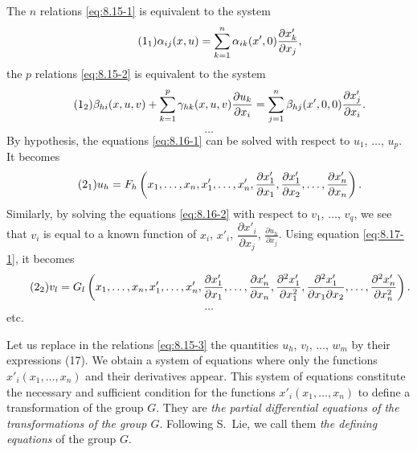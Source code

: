 \documentclass[leqno,11pt]{book}
\numberwithin{equation}{chapter}
\newcommand{\pd}{\partial}
\theoremstyle{shape1}
\theoremstyle{shapesmall}
\newcommand{\somespace}{\vspace{9pt}}
\begin{document}
The $n$ relations \eqref{eq:8.15-1} is equivalent to the system
\begin{equation}\addtocounter{equation}{1}
  \label{eq:8.16-1}\tag{\arabic{equation}$_{1}$}
  \alpha_{ij}(x,u)=\sum_{k=1}^{n}\alpha_{ik}(x',0)\frac{\pd x'_{k}}{\pd x_{j}},
\end{equation}
the $p$ relations \eqref{eq:8.15-2} is equivalent to the system
\begin{equation}
  \label{eq:8.16-2}\tag{\arabic{equation}$_{2}$}
  \beta_{hi}(x,u,v)+\sum_{k=1}^{p}\gamma_{hk}(x,u,v)\frac{\pd u_{k}}{\pd x_{i}}=\sum_{j=1}^{n}\beta_{hj}(x',0,0)\frac{\pd x'_{j}}{\pd x_{i}}.
\end{equation}
\[\hdots\]
By hypothesis, the equations \eqref{eq:8.16-1} can be solved with respect to $u_{1}$, $\dots$, $u_{p}$. It becomes
\begin{equation}\addtocounter{equation}{1}
  \label{eq:8.17-1}\tag{\arabic{equation}$_{1}$}
  u_{h}=F_{h}\left(x_{1},\dots,x_{n},x'_{1},\dots,x'_{n},\frac{\pd x'_{1}}{\pd x_{1}},\frac{\pd x'_{1}}{\pd x_{2}},\dots,\frac{\pd x'_{n}}{\pd x_{n}}\right).
\end{equation}
Similarly, by solving the equations \eqref{eq:8.16-2} with respect to $v_{1}$, $\dots$, $v_{q}$, we see that $v_{i}$ is equal to a known function of $x_{i}$, $x'_{i}$, $\dfrac{\pd x'_{i}}{\pd x_{j}}$, $\frac{\pd u_{h}}{\pd x_{j}}$. Using equation \eqref{eq:8.17-1}, it becomes
\begin{equation}
  \label{eq:8.17-2}\tag{\arabic{equation}$_{2}$}
  v_{l}=G_{l}\left(x_{1},\dots,x_{n},x'_{1},\dots,x'_{n},\frac{\pd x'_{1}}{\pd x_{1}},\dots,\frac{\pd x'_{n}}{\pd x_{n}},\frac{\pd^{2}x'_{1}}{\pd x^{2}_{1}},\frac{\pd^{2}x'_{1}}{\pd x_{1}\pd x_{2}},\dots,\frac{\pd^{2}x'_{n}}{\pd x^{2}_{n}}\right).
\end{equation}
\[\hdots\]
etc.

Let us replace in the relations \eqref{eq:8.15-3} the quantities $u_{h}$, $v_{l}$, $\dots$, $w_{m}$ by their expressions (17). We obtain a system of equations where only the functions $x'_{i}(x_{1},\dots,x_{n})$ and their derivatives appear. This system of equations constitute the necessary and sufficient condition for the functions $x'_{i}(x_{1},\dots,x_{n})$ to define a transformation of the group $G$. They are \emph{the partial differential equations of the transformations of the group $G$}. Following S.~Lie, we call them \emph{the defining equations} of the group $G$.

\somespace
\end{document}
